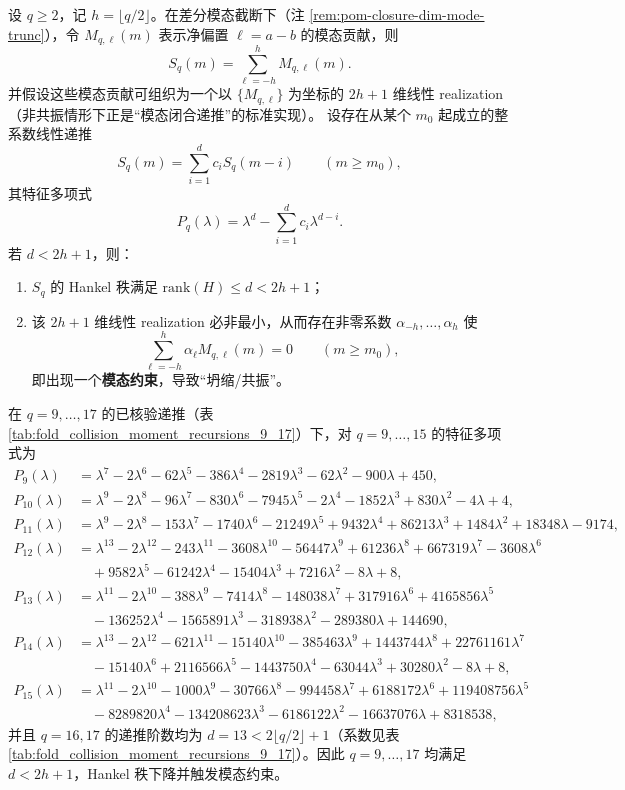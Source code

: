 \begin{theorem}\label{thm:pom-moment-resonance}
设 \(q\ge 2\)，记 \(h=\lfloor q/2\rfloor\)。在差分模态截断下（注 \ref{rem:pom-closure-dim-mode-trunc}），令 \(M_{q,\ell}(m)\) 表示净偏置 \(\ell=a-b\) 的模态贡献，则
$$
S_q(m)=\sum_{\ell=-h}^{h} M_{q,\ell}(m).
$$
并假设这些模态贡献可组织为一个以 \(\{M_{q,\ell}\}\) 为坐标的 \(2h+1\) 维线性 realization（非共振情形下正是“模态闭合递推”的标准实现）。
设存在从某个 \(m_0\) 起成立的整系数线性递推
$$
S_q(m)=\sum_{i=1}^{d} c_i S_q(m-i)\qquad(m\ge m_0),
$$
其特征多项式
$$
P_q(\lambda)=\lambda^d-\sum_{i=1}^d c_i\lambda^{d-i}.
$$
若 \(d<2h+1\)，则：
\begin{enumerate}
  \item \(S_q\) 的 Hankel 秩满足 \(\mathrm{rank}(H)\le d<2h+1\)；
  \item 该 \(2h+1\) 维线性 realization 必非最小，从而存在非零系数 \(\alpha_{-h},\dots,\alpha_h\) 使
  $$
  \sum_{\ell=-h}^{h}\alpha_\ell M_{q,\ell}(m)=0\qquad(m\ge m_0),
  $$
  即出现一个\textbf{模态约束}，导致“坍缩/共振”。
\end{enumerate}
在 \(q=9,\dots,17\) 的已核验递推（表 \ref{tab:fold_collision_moment_recursions_9_17}）下，对 \(q=9,\dots,15\) 的特征多项式为
$$
\begin{aligned}
P_9(\lambda)&=\lambda^7-2\lambda^6-62\lambda^5-386\lambda^4-2819\lambda^3-62\lambda^2-900\lambda+450,\\
P_{10}(\lambda)&=\lambda^9-2\lambda^8-96\lambda^7-830\lambda^6-7945\lambda^5-2\lambda^4-1852\lambda^3+830\lambda^2-4\lambda+4,\\
P_{11}(\lambda)&=\lambda^9-2\lambda^8-153\lambda^7-1740\lambda^6-21249\lambda^5+9432\lambda^4+86213\lambda^3+1484\lambda^2+18348\lambda-9174,
\\
P_{12}(\lambda)&=\lambda^{13}-2\lambda^{12}-243\lambda^{11}-3608\lambda^{10}-56447\lambda^9+61236\lambda^8+667319\lambda^7-3608\lambda^6\\
&\quad+9582\lambda^5-61242\lambda^4-15404\lambda^3+7216\lambda^2-8\lambda+8,\\
P_{13}(\lambda)&=\lambda^{11}-2\lambda^{10}-388\lambda^9-7414\lambda^8-148038\lambda^7+317916\lambda^6+4165856\lambda^5\\
&\quad-136252\lambda^4-1565891\lambda^3-318938\lambda^2-289380\lambda+144690,\\
P_{14}(\lambda)&=\lambda^{13}-2\lambda^{12}-621\lambda^{11}-15140\lambda^{10}-385463\lambda^9+1443744\lambda^8+22761161\lambda^7\\
&\quad-15140\lambda^6+2116566\lambda^5-1443750\lambda^4-63044\lambda^3+30280\lambda^2-8\lambda+8,\\
P_{15}(\lambda)&=\lambda^{11}-2\lambda^{10}-1000\lambda^9-30766\lambda^8-994458\lambda^7+6188172\lambda^6+119408756\lambda^5\\
&\quad-8289820\lambda^4-134208623\lambda^3-6186122\lambda^2-16637076\lambda+8318538,
\end{aligned}
$$
并且 \(q=16,17\) 的递推阶数均为 \(d=13<2\lfloor q/2\rfloor+1\)（系数见表 \ref{tab:fold_collision_moment_recursions_9_17}）。因此 \(q=9,\dots,17\) 均满足 \(d<2h+1\)，Hankel 秩下降并触发模态约束。
\end{theorem}
